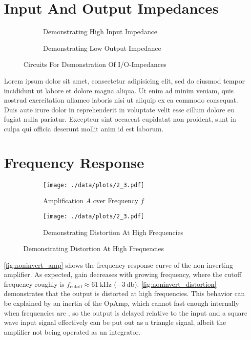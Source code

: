 \section{Input And Output Impedances}
\begin{figure}[tbp]
	\centering
	\begin{subfigure}{0.4\textwidth}
		\centering
		\caption{Demonstrating High Input Impedance}
		\label{schem:shitty_circuit_1}
	\end{subfigure}
	\begin{subfigure}{0.4\textwidth}
		\centering
		\caption{Demonstrating Low Output Impedance}
		\label{schem:shitty_circuit_2}
	\end{subfigure}
	\caption{Circuits For Demonstration Of I/O-Impedances}
\end{figure}
Lorem ipsum dolor sit amet, consectetur adipisicing elit, sed do eiusmod tempor incididunt ut labore et dolore magna aliqua. Ut enim ad minim veniam, quis nostrud exercitation ullamco laboris nisi ut aliquip ex ea commodo consequat. Duis aute irure dolor in reprehenderit in voluptate velit esse cillum dolore eu fugiat nulla pariatur. Excepteur sint occaecat cupidatat non proident, sunt in culpa qui officia deserunt mollit anim id est laborum.

\section{Frequency Response}
\begin{figure}[tbp]
	\centering
	\begin{subfigure}{0.4\textwidth}
		\centering
		\texttt{[image: ./data/plots/2\_3.pdf]}
		\caption{Amplification $A$ over Frequency $f$}
		\label{fig:noninvert_amp}
	\end{subfigure}
	\qquad\qquad
	\begin{subfigure}{0.4\textwidth}
		\centering
		\texttt{[image: ./data/plots/2\_3.pdf]}
		\caption{Demonstrating Distortion At High Frequencies}
		\label{fig:noninvert_distortion}
	\end{subfigure}
\end{figure}

\autoref{fig:noninvert_amp} shows the frequency response curve of the non-inverting amplifier.
As expected, gain decreases with growing frequency, where the cutoff frequency roughly is $f_\text{cutoff}\approx\SI{61}{\kilo\hertz}$ ($\SI{-3}{\decibel}$).
\autoref{fig:noninvert_distortion} demonstrates that the output is distorted at high frequencies.
This behavior can be explained by an inertia of the OpAmp, which cannot  fast enough internally when frequencies are , so the output is delayed relative to the input and a square wave input signal effectively can be put out as a triangle signal, albeit the amplifier not being operated as an integrator.
